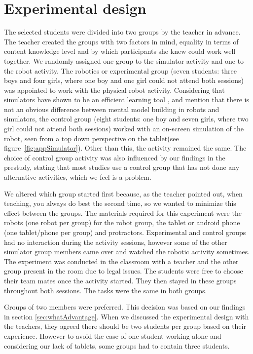 \section{Experimental design}
The selected students were divided into two groups by the teacher in advance. 
The teacher created the groups with two factors in mind, equality in terms of content knowledge level and by which participants she knew could work well together.
We randomly assigned one group to the simulator activity and one to the robot activity. The robotics or experimental group (seven students: three boys and four girls, where one boy and one girl could not attend both sessions) was appointed to work with the physical robot activity. Considering that simulators have shown to be an efficient learning tool \cite{mitnik2009collaborative}, and  mention that there is not an obvious difference between mental model building in robots and simulators, the control group (eight students: one boy and seven girls, where two girl could not attend both sessions) worked with an on-screen simulation of the robot, seen from a top down perspective on the tablet(see figure~\ref{fig:appSimulator}). Other than this, the activity remained the same. 
The choice of control group activity was also influenced by our findings in the prestudy, stating that most studies use a control group that has not done any alternative activities, which we feel is a problem. 

\bigskip\noindent
We altered which group started first because, as the teacher pointed out, when teaching, you always do best the second time, so we wanted to minimize this effect between the groups. The materials required for this experiment were the robots (one robot per group) for the robot group, the tablet or android phone (one tablet/phone per group) and protractors. Experimental and control groups had no interaction during the activity sessions, however some of the other simulator group members came over and watched the robotic activity sometimes. 
The experiment was conducted in the classroom with a teacher and the other group present in the room due to legal issues. 
The students were free to choose their team mates once the activity started. They then stayed in these groups throughout both sessions. The tasks were the same in both groups.

\bigskip\noindent
Groups of two members were preferred. This decision was based on our findings in section \ref{sec:whatAdvantage}. When we discussed the experimental design with the teachers, they agreed there should be two students per group based on their experience. However to avoid the case of one student working alone and considering our lack of tablets, some groups had to contain three students.
